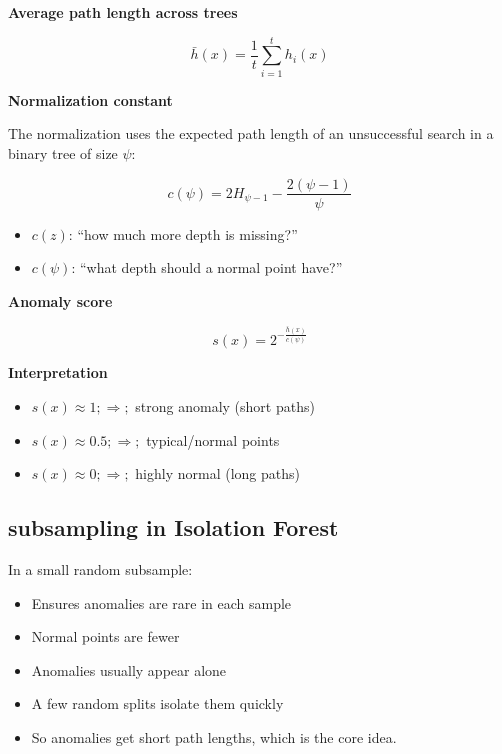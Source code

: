 \documentclass[10pt,a4paper]{article}
\begin{document}
		\vspace{0.5em}
		
		\textbf{Average path length across trees}
		
		\begin{equation*}
		\bar{h}(x) = \frac{1}{t} \sum_{i=1}^{t} h_i(x)
		\end{equation*}
		
		\vspace{0.5em}
		
		\textbf{Normalization constant}
		
		The normalization uses the expected path length of an unsuccessful search in a binary tree of size $\psi$:
		
		\begin{equation*}
		c(\psi) = 2 H_{\psi - 1} - \frac{2(\psi - 1)}{\psi}
		\end{equation*}
		
		\vspace{0.5em}
		
		\begin{itemize}
			\item $c(z)$: “how much more depth is missing?”
			\item $c(\psi)$: “what depth should a normal point have?”
		\end{itemize}
		
		\textbf{Anomaly score}
		
		\begin{equation*}
		s(x) = 2^{-\frac{\bar{h}(x)}{c(\psi)}}
		\end{equation*}
		
		\vspace{0.5em}
		
		\textbf{Interpretation}
		
		\begin{itemize}
		\item $s(x) \approx 1 ;\Rightarrow;$ strong anomaly (short paths)
		\item $s(x) \approx 0.5 ;\Rightarrow;$ typical/normal points
		\item $s(x) \approx 0 ;\Rightarrow;$ highly normal (long paths)
		\end{itemize}
		
	
		\subsection{subsampling in Isolation Forest}
	
		In a small random subsample:
		\begin{itemize}
			\item Ensures anomalies are rare in each sample
			\item Normal points are fewer
			\item Anomalies usually appear alone
			\item A few random splits isolate them quickly
			\item So anomalies get short path lengths, which is the core idea.
		\end{itemize}
	
\end{document}
